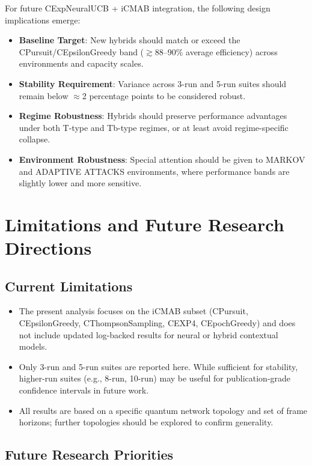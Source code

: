 \documentclass[12pt,a4paper]{article}
\begin{document}
For future CExpNeuralUCB + iCMAB integration, the following design implications emerge:

\begin{itemize}
\item \textbf{Baseline Target}: New hybrids should match or exceed the CPursuit/CEpsilonGreedy band ($\gtrsim$88–90\% average efficiency) across environments and capacity scales.
\item \textbf{Stability Requirement}: Variance across 3-run and 5-run suites should remain below $\approx$2 percentage points to be considered robust.
\item \textbf{Regime Robustness}: Hybrids should preserve performance advantages under both T-type and Tb-type regimes, or at least avoid regime-specific collapse.
\item \textbf{Environment Robustness}: Special attention should be given to MARKOV and ADAPTIVE ATTACKS environments, where performance bands are slightly lower and more sensitive.
\end{itemize}

\section{Limitations and Future Research Directions}

\subsection{Current Limitations}

\begin{itemize}
\item The present analysis focuses on the iCMAB subset (CPursuit, CEpsilonGreedy, CThompsonSampling, CEXP4, CEpochGreedy) and does not include updated log-backed results for neural or hybrid contextual models.
\item Only 3-run and 5-run suites are reported here. While sufficient for stability, higher-run suites (e.g., 8-run, 10-run) may be useful for publication-grade confidence intervals in future work.
\item All results are based on a specific quantum network topology and set of frame horizons; further topologies should be explored to confirm generality.
\end{itemize}

\subsection{Future Research Priorities}
\end{document}
